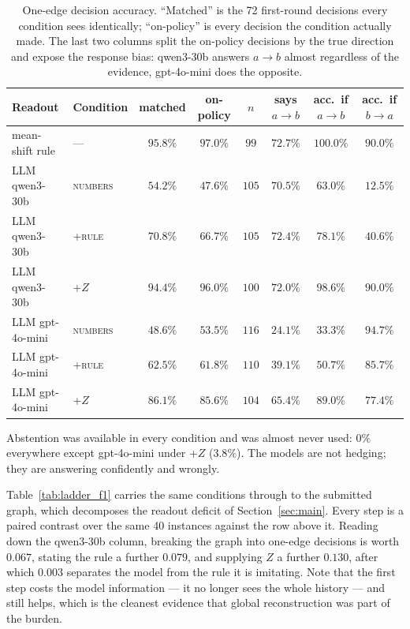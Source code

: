 \documentclass{article}
\begin{document}
\begin{table}[h]
\caption{One-edge decision accuracy. ``Matched'' is the 72 first-round decisions every
condition sees identically; ``on-policy'' is every decision the condition actually made. The
last two columns split the on-policy decisions by the true direction and expose the response
bias: qwen3-30b answers $a \to b$ almost regardless of the evidence, gpt-4o-mini does the
opposite.}
\label{tab:ladder_dec}
\centering
\small
\setlength{\tabcolsep}{4.5pt}
\begin{tabular}{llcccccc}
\toprule
Readout & Condition & matched & on-policy & $n$ & says $a\to b$ & acc.\ if $a\to b$ & acc.\ if $b\to a$ \\
\midrule
mean-shift rule & --- & $95.8\%$ & $\mathbf{97.0\%}$ & $99$ & $72.7\%$ & $100.0\%$ & $90.0\%$ \\
\midrule
LLM qwen3-30b & \textsc{numbers} & $54.2\%$ & $47.6\%$ & $105$ & $70.5\%$ & $63.0\%$ & $12.5\%$ \\
LLM qwen3-30b & \textsc{+rule} & $70.8\%$ & $66.7\%$ & $105$ & $72.4\%$ & $78.1\%$ & $40.6\%$ \\
LLM qwen3-30b & \textsc{+$Z$} & $94.4\%$ & $\mathbf{96.0\%}$ & $100$ & $72.0\%$ & $98.6\%$ & $90.0\%$ \\
\midrule
LLM gpt-4o-mini & \textsc{numbers} & $48.6\%$ & $53.5\%$ & $116$ & $24.1\%$ & $33.3\%$ & $94.7\%$ \\
LLM gpt-4o-mini & \textsc{+rule} & $62.5\%$ & $61.8\%$ & $110$ & $39.1\%$ & $50.7\%$ & $85.7\%$ \\
LLM gpt-4o-mini & \textsc{+$Z$} & $86.1\%$ & $\mathbf{85.6\%}$ & $104$ & $65.4\%$ & $89.0\%$ & $77.4\%$ \\
\bottomrule
\end{tabular}
\end{table}

Abstention was available in every condition and was almost never used: $0\%$ everywhere except
gpt-4o-mini under \textsc{+$Z$} ($3.8\%$). The models are not hedging; they are answering
confidently and wrongly.

Table~\ref{tab:ladder_f1} carries the same conditions through to the submitted graph, which
decomposes the readout deficit of Section~\ref{sec:main}. Every step is a paired contrast over
the same 40 instances against the row above it. Reading down the qwen3-30b column, breaking the
graph into one-edge decisions is worth $0.067$, stating the rule a further $0.079$, and
supplying $Z$ a further $0.130$, after which $0.003$ separates the model from the rule it is
imitating. Note that the first step costs the model information --- it no longer sees the whole
history --- and still helps, which is the cleanest evidence that global reconstruction was part
of the burden.
\end{document}
